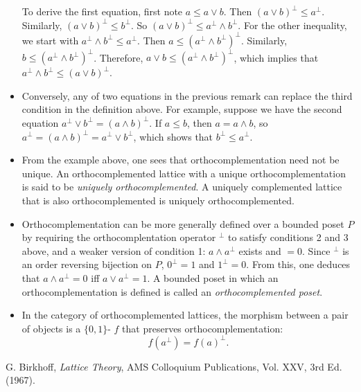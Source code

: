 \documentclass[12pt]{article}
\begin{document}
\begin{itemize}
To derive the first equation, first note $a\le a\vee b$.  Then $(a\vee b)^{\perp}\le a^{\perp}$. 
Similarly, $(a\vee b)^{\perp}\le b^{\perp}$.  So $(a\vee b)^{\perp}\le
a^{\perp}\wedge b^{\perp}$.  For the other inequality, we start with
$a^{\perp}\wedge b^{\perp}\le a^{\perp}$.  Then $a\le (a^{\perp}\wedge
b^{\perp})^{\perp}$.  Similarly, $b\le (a^{\perp}\wedge b^{\perp})^{\perp}$. 
Therefore, $a\vee b\le (a^{\perp}\wedge b^{\perp})^{\perp}$, which implies that
$a^{\perp}\wedge b^{\perp}\le (a\vee b)^{\perp}$.
\item Conversely, any of two equations in the previous remark can replace the third condition in the definition above.  For example, suppose we have the second equation $a^{\perp}\vee b^{\perp}=(a\wedge b)^{\perp}$.  If $a\le b$, then $a=a\wedge b$, so $a^{\perp}=(a\wedge b)^{\perp}=a^{\perp}\vee b^{\perp}$, which shows that $b^{\perp}\le a^{\perp}$.
\item From the example above, one sees that orthocomplementation need not be unique.  An orthocomplemented lattice with a unique orthocomplementation is said to be \emph{uniquely orthocomplemented}.  A uniquely complemented lattice that is also orthocomplemented is uniquely orthocomplemented.
\item Orthocomplementation can be more generally defined over a bounded poset $P$ by requiring the orthocomplentation operator $^{\perp}$ to satisfy conditions 2 and 3 above, and a weaker version of condition 1: $a\wedge a^{\perp}$ exists and $=0$.  Since $^{\perp}$ is an order reversing bijection on $P$, $0^{\perp}=1$ and $1^{\perp}=0$.  From this, one deduces that $a\wedge a^{\perp}=0$ iff $a\vee a^{\perp}=1$.  A bounded poset in which an orthocomplementation is defined is called an \emph{orthocomplemented poset}.
\item In the category of orthocomplemented lattices, the morphism between a pair of objects is a $\lbrace 0,1\rbrace$- $f$ that preserves orthocomplementation: $$f(a^{\perp})=f(a)^{\perp}.$$
\end{itemize}

\begin{thebibliography}{8}
 G. Birkhoff, {\em Lattice Theory}, AMS Colloquium Publications, Vol. XXV, 3rd Ed. (1967).
\end{thebibliography}
\end{document}
